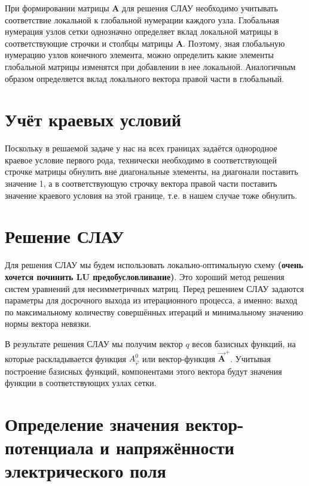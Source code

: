При формировании матрицы \textbf{A} для решения СЛАУ необходимо учитывать соответствие локальной к глобальной нумерации каждого узла. Глобальная нумерация узлов сетки однозначно определяет вклад локальной матрицы в соответствующие строчки и столбцы матрицы \textbf{A}. Поэтому, зная глобальную нумерацию узлов конечного элемента, можно определить какие элементы глобальной матрицы изменятся при добавлении в нее локальной. Аналогичным образом определяется вклад локального вектора правой части в глобальный.


\section{Учёт краевых условий}

Поскольку в решаемой задаче у нас на всех границах задаётся однородное краевое условие первого рода, технически необходимо в соответствующей строчке матрицы обнулить вне диагональные элементы, на диагонали поставить значение 1, а в соответствующую строчку вектора правой части поставить значение краевого условия на этой границе, т.е. в нашем случае тоже обнулить.

\section{Решение СЛАУ}

Для решения СЛАУ мы будем использовать локально-оптимальную схему \textbf{(очень хочется починить LU предобусловливание)}. Это хороший метод решения систем уравнений для несимметричных матриц. Перед решением СЛАУ задаются параметры для досрочного выхода из итерационного процесса, а именно: выход по максимальному количеству совершённых итераций и минимальному значению нормы вектора невязки.


В результате решения СЛАУ мы получим вектор $q$ весов базисных функций, на которые раскладывается функция $A_{\varphi}^0$ или вектор-функция $\overrightarrow{\textbf{A}}^{+}$. Учитывая построение базисных функций, компонентами этого вектора будут значения функции в соответствующих узлах сетки.

\section{Определение значения вектор-потенциала и напряжённости электрического поля}

